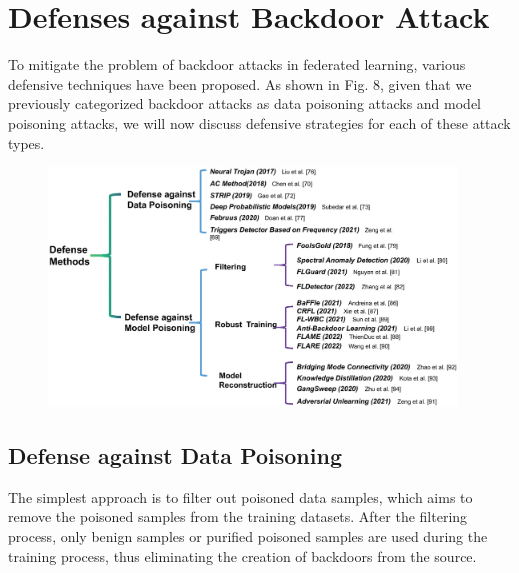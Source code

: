 \section{Defenses against Backdoor Attack}  
To mitigate the problem of backdoor attacks in
federated learning, various defensive techniques have been
proposed. As shown in Fig. 8, given that we previously
categorized backdoor attacks as data poisoning attacks
and model poisoning attacks, we will now discuss defensive
strategies for each of these attack types.  

\begin{figure}[h]
    \centering
    \includegraphics[width=1.0\linewidth,height=2.5in]{output/fig8.eps}
     \caption{}
     \label{fig8}
\end{figure}

\subsection{Defense against Data Poisoning}  
The simplest approach is to filter out poisoned data
samples, which aims to remove the poisoned samples from
the training datasets. After the filtering process, only
benign samples or purified poisoned samples are used
during the training process, thus eliminating the creation
of backdoors from the source.  

